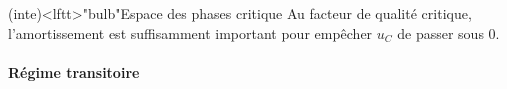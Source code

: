 \documentclass[../../main/main.tex]{subfiles}
\begin{document}
\begin{tcb}[sidebyside, righthand ratio=.3]
	(inte)<lftt>"bulb"{Espace des phases critique}
	Au facteur de qualité critique, l'amortissement est suffisamment important
	pour empêcher $u_C$ de passer sous 0.
	\tcblower
	\begin{center}
	\end{center}
\end{tcb}

\paragraph{Régime transitoire}
~ \smallbreak
\end{document}
